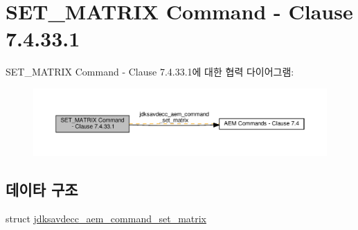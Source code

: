 \hypertarget{group__command__set__matrix}{}\section{S\+E\+T\+\_\+\+M\+A\+T\+R\+IX Command -\/ Clause 7.4.33.1}
\label{group__command__set__matrix}
S\+E\+T\+\_\+\+M\+A\+T\+R\+IX Command -\/ Clause 7.4.33.1에 대한 협력 다이어그램\+:
\nopagebreak
\begin{figure}[H]
\begin{center}
\leavevmode
\includegraphics[width=350pt]{group__command__set__matrix}
\end{center}
\end{figure}
\subsection*{데이타 구조}
\begin{DoxyCompactItemize}
\item 
struct \hyperlink{structjdksavdecc__aem__command__set__matrix}{jdksavdecc\+\_\+aem\+\_\+command\+\_\+set\+\_\+matrix}
\end{DoxyCompactItemize}
